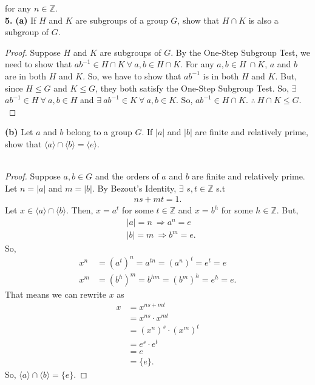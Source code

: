 \documentclass[12pt, letterpaper]{article}
\begin{document}
for any $n \in \mathbb{Z}$. \\
\vspace{0.2 em}
\textbf{5.} \textbf{(a)} If $H$ and $K$ are subgroups of a group $G$, show that $H \cap K$ is also a subgroup of $G.$ 
\begin{proof}
    Suppose $H$ and $K$ are subgroups of $G$. By the One-Step Subgroup Test, we need to show that $ab^{-1} \in H \cap K \ \forall \ a,b \in H \cap K$. For any $a,b \in H \ \cap K$, $a$ and $b$ are in both $H$ and $K$. So, we have to show that $ab^{-1}$ is in both $H$ and $K$. But, since $H \leq G$ and $K \leq G$, they both satisfy the One-Step Subgroup Test. So, $\exists$ $ab^{-1} \in H \ \forall \ a,b \in H$ and $\exists \ ab^{-1} \in K \ \forall \ a,b \in K$. So, $ab^{-1} \in H \cap K$. $\therefore \ H \cap K \leq G.$
\end{proof}
\indent \textbf{(b)} Let $a$ and $b$ belong to a group $G$. If $|a|$ and $|b|$ are finite and relatively prime, show that $\langle{a}\rangle \cap \langle{b}\rangle = \langle{e}\rangle$. \\ \\
\begin{proof}
    Suppose $a,b \in G$ and the orders of $a$ and $b$ are finite and relatively prime. Let $n = |a|$ and $m = |b|$. By Bezout's Identity, $\exists$ $s, t \in \mathbb{Z}$ s.t
    \begin{align*}
        ns + mt = 1.
    \end{align*}
    Let $x \in \langle a \rangle \cap \langle b \rangle$. Then, $x = a^{t}$ for some $t \in \mathbb{Z}$ and $x = b^{h}$ for some $h \in \mathbb{Z}$. But,
    \begin{align*}
        &|a| = n \ \Rightarrow a^{n} = e \\
        &|b| = m \ \Rightarrow b^{m} = e. 
    \end{align*}
    So, 
    \begin{align*}
        x^{n} &= (a^t)^{n} = a^{tn} = (a^{n})^{t} = e^{t} = e \\
        x^{m} &= (b^h)^{m} = b^{hm} = (b^{m})^{h} = e^h = e.
    \end{align*}
    That means we can rewrite $x$ as 
    \begin{align*}
        x &= x^{ns + mt} \\
        &= x^{ns} \cdot x^{mt} \\
        &= (x^{n})^s \cdot (x^{m})^{t} \\
        &= e^{s} \cdot e^{t} \\
        &= e \\
        &= \{e\}.
    \end{align*}
    So, $\langle{a}\rangle \cap \langle{b}\rangle = \{{e}\}$.
\end{proof}
\end{document}
